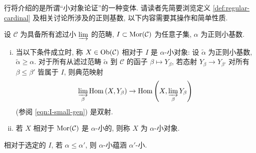 行将介绍的是所谓``小对象论证''的一种变体. 请读者先简要浏览定义 \ref{def:regular-cardinal} 及相关讨论所涉及的正则基数, 以下内容需要其操作和简单性质.

\begin{definition}\label{def:I-small}
	设 $\mathcal{C}$ 为具备所有滤过小 $\varinjlim$ 的范畴, $I \subset \operatorname{Mor}(\mathcal{C})$ 为任意子集, $\alpha$ 为正则小基数.
	\begin{enumerate}[(i)]
		\item 当以下条件成立时, 称 $X \in \operatorname{Ob}(\mathcal{C})$ 相对于 $I$ 是 $\alpha$-小对象: 设 $\tilde{\alpha}$ 为正则小基数, $\tilde{\alpha} \geq \alpha$. 对于所有从滤过范畴 $\tilde{\alpha}$ 到 $\mathcal{C}$ 的函子 $\beta \mapsto Y_\beta$, 若态射 $Y_\beta \to Y_{\beta'}$ 对所有 $\beta \leq \beta'$ 皆属于 $I$, 则典范映射
		\[ \varinjlim_{\beta} \operatorname{Hom}\left( X, Y_\beta \right) \to \operatorname{Hom}\left( X, \varinjlim_\beta Y_\beta \right) \]
		(参阅 \eqref{eqn:I-small-gen}) 是双射.
		
		\item 若 $X$ 相对于 $\operatorname{Mor}(\mathcal{C})$ 是 $\alpha$-小的, 则称 $X$ 为 $\alpha$-小对象.
	\end{enumerate}
\end{definition}

相对于选定的 $I$, 若 $\alpha \leq \alpha'$, 则 $\alpha$-小蕴涵 $\alpha'$-小.

